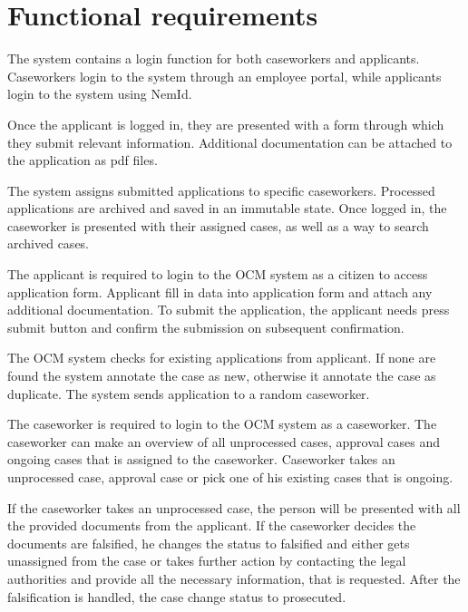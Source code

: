 \newpage
\section{Functional requirements}

The system contains a login function for both caseworkers and applicants. Caseworkers login to the system through an employee portal, while applicants login to the system using NemId.

\vspace{2mm}

Once the applicant is logged in, they are presented with a form through which they submit relevant information. Additional documentation can be attached to the application as pdf files.

\vspace{2mm}

The system assigns submitted applications to specific caseworkers. Processed applications are archived and saved in an immutable state. Once logged in, the caseworker is presented with their assigned cases, as well as a way to search archived cases.

The applicant is required to login to the OCM system as a citizen to access application form. Applicant fill in data into application form and attach any additional documentation. To submit the application, the applicant needs press submit button and confirm the submission on subsequent confirmation.

\vspace{2mm}

The OCM system checks for existing applications from applicant. If none are found the system annotate the case as new, otherwise it annotate the case as duplicate. The system sends application to a random caseworker.

\vspace{2mm}

The caseworker is required to login to the OCM system as a caseworker. The caseworker can make an overview of all unprocessed cases, approval cases and ongoing cases that is assigned to the caseworker. Caseworker takes an unprocessed case, approval case or pick one of his existing cases that is ongoing.

If the caseworker takes an unprocessed case, the person will be presented with all the provided documents from the applicant. If the caseworker decides the documents are falsified, he changes the status to falsified and either gets unassigned from the case or takes further action by contacting the legal authorities and provide all the necessary information, that is requested. After the falsification is handled, the case change status to prosecuted.

